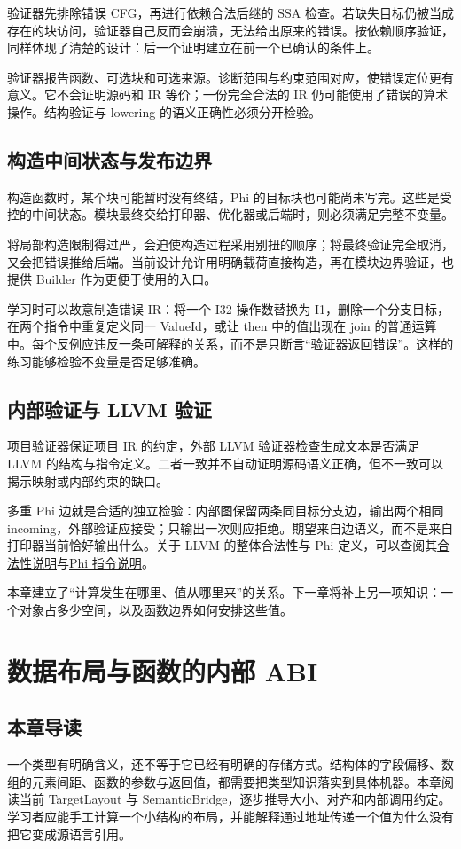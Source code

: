 验证器先排除错误 CFG，再进行依赖合法后继的 SSA 检查。若缺失目标仍被当成存在的块访问，验证器自己反而会崩溃，无法给出原来的错误。按依赖顺序验证，同样体现了清楚的设计：后一个证明建立在前一个已确认的条件上。

验证器报告函数、可选块和可选来源。诊断范围与约束范围对应，使错误定位更有意义。它不会证明源码和 IR 等价；一份完全合法的 IR 仍可能使用了错误的算术操作。结构验证与 lowering 的语义正确性必须分开检验。

\section{构造中间状态与发布边界}
构造函数时，某个块可能暂时没有终结，Phi 的目标块也可能尚未写完。这些是受控的中间状态。模块最终交给打印器、优化器或后端时，则必须满足完整不变量。

将局部构造限制得过严，会迫使构造过程采用别扭的顺序；将最终验证完全取消，又会把错误推给后端。当前设计允许用明确载荷直接构造，再在模块边界验证，也提供 Builder 作为更便于使用的入口。

学习时可以故意制造错误 IR：将一个 I32 操作数替换为 I1，删除一个分支目标，在两个指令中重复定义同一 ValueId，或让 then 中的值出现在 join 的普通运算中。每个反例应违反一条可解释的关系，而不是只断言“验证器返回错误”。这样的练习能够检验不变量是否足够准确。

\section{内部验证与 LLVM 验证}
项目验证器保证项目 IR 的约定，外部 LLVM 验证器检查生成文本是否满足 LLVM 的结构与指令定义。二者一致并不自动证明源码语义正确，但不一致可以揭示映射或内部约束的缺口。

多重 Phi 边就是合适的独立检验：内部图保留两条同目标分支边，输出两个相同 incoming，外部验证应接受；只输出一次则应拒绝。期望来自边语义，而不是来自打印器当前恰好输出什么。关于 LLVM 的整体合法性与 Phi 定义，可以查阅其\href{https://llvm.org/docs/LangRef.html#well-formedness}{合法性说明}与\href{https://llvm.org/docs/LangRef.html#phi-instruction}{Phi 指令说明}。

本章建立了“计算发生在哪里、值从哪里来”的关系。下一章将补上另一项知识：一个对象占多少空间，以及函数边界如何安排这些值。

\chapter{数据布局与函数的内部 ABI}
\label{chap:layout-abi}
\section*{本章导读}
一个类型有明确含义，还不等于它已经有明确的存储方式。结构体的字段偏移、数组的元素间距、函数的参数与返回值，都需要把类型知识落实到具体机器。本章阅读当前 TargetLayout 与 SemanticBridge，逐步推导大小、对齐和内部调用约定。学习者应能手工计算一个小结构的布局，并能解释通过地址传递一个值为什么没有把它变成源语言引用。

